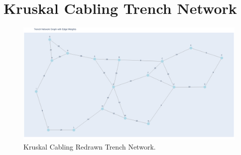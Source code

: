 \documentclass[11pt]{book}
\renewcommand{\=}[1]{\stackrel{#1}{=}} %
\theoremstyle{definition}
\theoremstyle{remark}
\begin{document}
\section{Kruskal Cabling Trench Network}
\begin{figure}
    \centering
    \includegraphics[width=1\linewidth]{img/Trench Network.png}
    \caption{Kruskal Cabling Redrawn Trench Network.}
    \label{fig:enter-label}
\end{figure}
\end{document}
